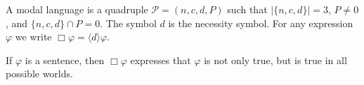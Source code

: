 A modal language is a quadruple $\mathcal{P} = (n, c, d, P)$ such that $|\{n, c, d\}| = 3$, $P \neq 0$, and $\{n, c, d\} \cap P = 0$. The symbol $d$ is the necessity symbol. For any expression $\varphi$ we write $\Box \varphi = \langle d \rangle \varphi$.

If $\varphi$ is a sentence, then $\Box \varphi$ expresses that $\varphi$ is not only true, but is true in all possible worlds.
